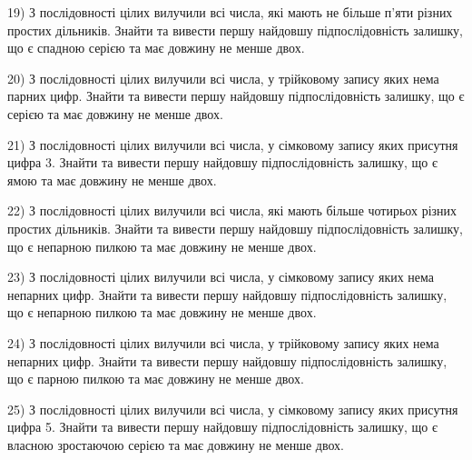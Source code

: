 \documentclass[11pt, ukrainian]{article}
\begin{document}
\par
\vspace{0.9cm}
19) \space 
З послідовності цілих вилучили всі числа, які мають не більше п'яти різних простих дільників. Знайти та вивести першу найдовшу підпослідовність залишку, що є спадною серією та має довжину не менше двох.

\par
\vspace{0.9cm}
20) \space 
З послідовності цілих вилучили всі числа, у трійковому запису яких нема парних цифр. Знайти та вивести першу найдовшу підпослідовність залишку, що є серією та має довжину не менше двох.

\par
\vspace{0.9cm}
21) \space 
З послідовності цілих вилучили всі числа, у сімковому запису яких присутня цифра 3. Знайти та вивести першу найдовшу підпослідовність залишку, що є ямою та має довжину не менше двох.

\par
\vspace{0.9cm}
22) \space 
З послідовності цілих вилучили всі числа, які мають більше чотирьох різних простих дільників. Знайти та вивести першу найдовшу підпослідовність залишку, що є непарною пилкою та має довжину не менше двох.

\par
\vspace{0.9cm}
23) \space 
З послідовності цілих вилучили всі числа, у сімковому запису яких нема непарних цифр. Знайти та вивести першу найдовшу підпослідовність залишку, що є непарною пилкою та має довжину не менше двох.

\par
\vspace{0.9cm}
24) \space 
З послідовності цілих вилучили всі числа, у трійковому запису яких нема непарних цифр. Знайти та вивести першу найдовшу підпослідовність залишку, що є парною пилкою та має довжину не менше двох.

\par
\vspace{0.9cm}
25) \space 
З послідовності цілих вилучили всі числа, у сімковому запису яких присутня цифра 5. Знайти та вивести першу найдовшу підпослідовність залишку, що є власною зростаючою серією та має довжину не менше двох.
\end{document}
